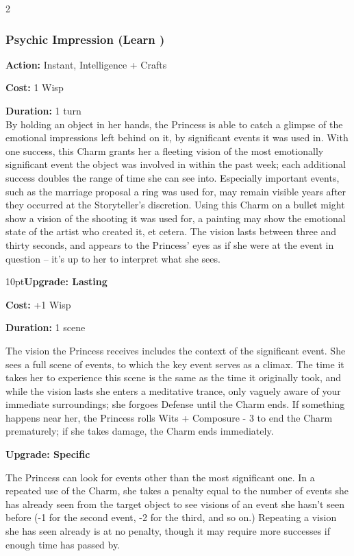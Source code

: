 \begin{multicols}{2}
\subsubsection*{Psychic Impression (Learn \textbullet\textbullet\textbullet)}

\noindent \textbf{Action:} Instant, Intelligence + Crafts

\noindent \textbf{Cost:} 1 Wisp

\noindent \textbf{Duration:} 1 turn \\

\noindent By holding an object in her hands, the Princess is able to catch a glimpse of the emotional impressions left behind on it, by significant events it was used in. With one success, this Charm grants her a fleeting vision of the most emotionally significant event the object was involved in within the past week; each additional success doubles the range of time she can see into. Especially important events, such as the marriage proposal a ring was used for, may remain visible years after they occurred at the Storyteller's discretion. Using this Charm on a bullet might show a vision of the shooting it was used for, a painting may show the emotional state of the artist who created it, et cetera. The vision lasts between three and thirty seconds, and appears to the Princess' eyes as if she were at the event in question -- it's up to her to interpret what she sees.

\begin{myindentpar}{10pt}\textbf{Upgrade: Lasting}

\noindent \textbf{Cost:} +1 Wisp

\noindent \textbf{Duration:} 1 scene 

The vision the Princess receives includes the context of the significant event. She sees a full scene of events, to which the key event serves as a climax. The time it takes her to experience this scene is the same as the time it originally took, and while the vision lasts she enters a meditative trance, only vaguely aware of your immediate surroundings; she forgoes Defense until the Charm ends. If something happens near her, the Princess rolls Wits + Composure - 3 to end the Charm prematurely; if she takes damage, the Charm ends immediately.

\textbf{Upgrade: Specific}

The Princess can look for events other than the most significant one. In a repeated use of the Charm, she takes a penalty equal to the number of events she has already seen from the target object to see visions of an event she hasn't seen before (-1 for the second event, -2 for the third, and so on.) Repeating a vision she has seen already is at no penalty, though it may require more successes if enough time has passed by.\end{myindentpar}



\end{multicols}
